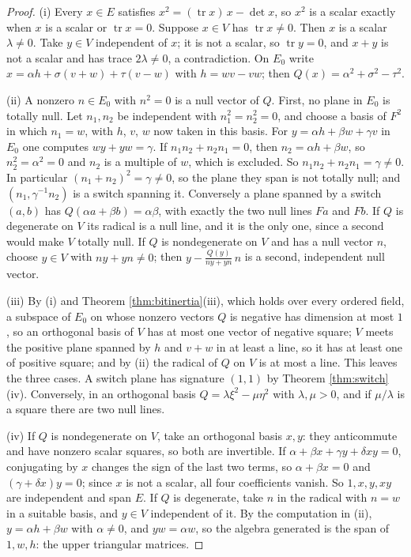\documentclass[11pt]{article}
\theoremstyle{plain}
\theoremstyle{definition}
\theoremstyle{plain}
\theoremstyle{definition}
\begin{document}
\begin{proof}
(i) Every $x \in E$ satisfies $x^{2} = (\operatorname{tr}x)\,x - \det x$, so $x^{2}$ is a scalar exactly when $x$ is a scalar or $\operatorname{tr}x = 0$. Suppose $x \in V$ has $\operatorname{tr}x \neq 0$. Then $x$ is a scalar $\lambda \neq 0$. Take $y \in V$ independent of $x$; it is not a scalar, so $\operatorname{tr}y = 0$, and $x + y$ is not a scalar and has trace $2\lambda \neq 0$, a contradiction. On $E_{0}$ write $x = \alpha h + \sigma(v + w) + \tau(v - w)$ with $h = wv - vw$; then $Q(x) = \alpha^{2} + \sigma^{2} - \tau^{2}$.

(ii) A nonzero $n \in E_{0}$ with $n^{2} = 0$ is a null vector of $Q$. First, no plane in $E_{0}$ is totally null. Let $n_{1}, n_{2}$ be independent with $n_{1}^{2} = n_{2}^{2} = 0$, and choose a basis of $F^{2}$ in which $n_{1} = w$, with $h$, $v$, $w$ now taken in this basis. For $y = \alpha h + \beta w + \gamma v$ in $E_{0}$ one computes $wy + yw = \gamma$. If $n_{1}n_{2} + n_{2}n_{1} = 0$, then $n_{2} = \alpha h + \beta w$, so $n_{2}^{2} = \alpha^{2} = 0$ and $n_{2}$ is a multiple of $w$, which is excluded. So $n_{1}n_{2} + n_{2}n_{1} = \gamma \neq 0$. In particular $(n_{1} + n_{2})^{2} = \gamma \neq 0$, so the plane they span is not totally null; and $(n_{1}, \gamma^{-1}n_{2})$ is a switch spanning it. Conversely a plane spanned by a switch $(a,b)$ has $Q(\alpha a + \beta b) = \alpha\beta$, with exactly the two null lines $Fa$ and $Fb$. If $Q$ is degenerate on $V$ its radical is a null line, and it is the only one, since a second would make $V$ totally null. If $Q$ is nondegenerate on $V$ and has a null vector $n$, choose $y \in V$ with $ny + yn \neq 0$; then $y - \tfrac{Q(y)}{ny + yn}\,n$ is a second, independent null vector.

(iii) By (i) and Theorem \ref{thm:bitinertia}(iii), which holds over every ordered field, a subspace of $E_{0}$ on whose nonzero vectors $Q$ is negative has dimension at most $1$, so an orthogonal basis of $V$ has at most one vector of negative square; $V$ meets the positive plane spanned by $h$ and $v + w$ in at least a line, so it has at least one of positive square; and by (ii) the radical of $Q$ on $V$ is at most a line. This leaves the three cases. A switch plane has signature $(1,1)$ by Theorem \ref{thm:switch}(iv). Conversely, in an orthogonal basis $Q = \lambda\xi^{2} - \mu\eta^{2}$ with $\lambda, \mu > 0$, and if $\mu/\lambda$ is a square there are two null lines.

(iv) If $Q$ is nondegenerate on $V$, take an orthogonal basis $x, y$: they anticommute and have nonzero scalar squares, so both are invertible. If $\alpha + \beta x + \gamma y + \delta xy = 0$, conjugating by $x$ changes the sign of the last two terms, so $\alpha + \beta x = 0$ and $(\gamma + \delta x)y = 0$; since $x$ is not a scalar, all four coefficients vanish. So $1, x, y, xy$ are independent and span $E$. If $Q$ is degenerate, take $n$ in the radical with $n = w$ in a suitable basis, and $y \in V$ independent of it. By the computation in (ii), $y = \alpha h + \beta w$ with $\alpha \neq 0$, and $yw = \alpha w$, so the algebra generated is the span of $1, w, h$: the upper triangular matrices.


\end{proof}
\end{document}
